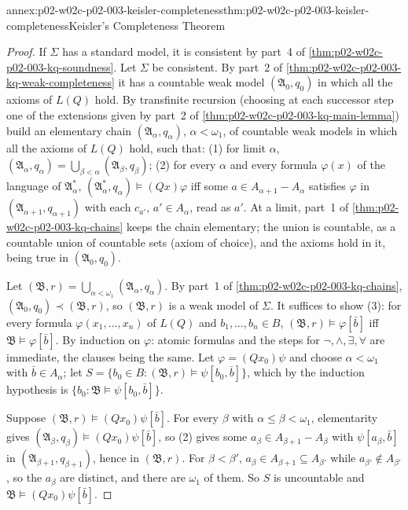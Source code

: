 \begin{annexitem}{annex:p02-w02c-p02-003-keisler-completeness}{thm:p02-w02c-p02-003-keisler-completeness}{Keisler's Completeness Theorem}
\begin{proof}
If \(\Sigma\) has a standard model, it is consistent by part~4 of
\cref{thm:p02-w02c-p02-003-kq-soundness}.  Let \(\Sigma\) be consistent.
By part~2 of \cref{thm:p02-w02c-p02-003-kq-weak-completeness} it has a
countable weak model \((\mathfrak A_0,q_0)\) in which all the axioms of
\(L(Q)\) hold.  By transfinite recursion (choosing at each successor step
one of the extensions given by part~2 of
\cref{thm:p02-w02c-p02-003-kq-main-lemma}) build an elementary chain
\((\mathfrak A_\alpha,q_\alpha)\), \(\alpha<\omega_1\), of countable weak
models in which all the axioms of \(L(Q)\) hold, such that: (1) for limit
\(\alpha\), \((\mathfrak A_\alpha,q_\alpha)=\bigcup_{\beta<\alpha}
(\mathfrak A_\beta,q_\beta)\); (2) for every \(\alpha\) and every formula
\(\varphi(x)\) of the language of \(\mathfrak A_\alpha^{*}\),
\((\mathfrak A_\alpha^{*},q_\alpha)\models(Qx)\varphi\) iff some \(a\in
A_{\alpha+1}-A_\alpha\) satisfies \(\varphi\) in
\((\mathfrak A_{\alpha+1},q_{\alpha+1})\) with each \(c_{a'}\),
\(a'\in A_\alpha\), read as \(a'\).  At a limit, part~1 of
\cref{thm:p02-w02c-p02-003-kq-chains} keeps the chain elementary; the union
is countable, as a countable union of countable sets (axiom of choice), and
the axioms hold in it, being true in \((\mathfrak A_0,q_0)\).

Let \((\mathfrak B,r)=\bigcup_{\alpha<\omega_1}(\mathfrak A_\alpha,q_\alpha)\).
By part~1 of \cref{thm:p02-w02c-p02-003-kq-chains},
\((\mathfrak A_0,q_0)\prec(\mathfrak B,r)\), so \((\mathfrak B,r)\) is a
weak model of \(\Sigma\).  It suffices to show (3): for every formula
\(\varphi(x_1,\ldots,x_n)\) of \(L(Q)\) and \(b_1,\ldots,b_n\in B\),
\((\mathfrak B,r)\models\varphi[\bar b]\) iff \(\mathfrak B\models\varphi[\bar
b]\).  By induction on \(\varphi\): atomic formulas and the steps for
\(\neg,\land,\exists,\forall\) are immediate, the clauses being the same.
Let \(\varphi=(Qx_0)\psi\) and choose \(\alpha<\omega_1\) with \(\bar b\in
A_\alpha\); let
\(S=\{b_0\in B:(\mathfrak B,r)\models\psi[b_0,\bar b]\}\), which by the
induction hypothesis is \(\{b_0:\mathfrak B\models\psi[b_0,\bar b]\}\).

Suppose \((\mathfrak B,r)\models(Qx_0)\psi[\bar b]\).  For every
\(\beta\) with \(\alpha\le\beta<\omega_1\), elementarity gives
\((\mathfrak A_\beta,q_\beta)\models(Qx_0)\psi[\bar b]\), so (2) gives some
\(a_\beta\in A_{\beta+1}-A_\beta\) with \(\psi[a_\beta,\bar b]\) in
\((\mathfrak A_{\beta+1},q_{\beta+1})\), hence in \((\mathfrak B,r)\).  For
\(\beta<\beta'\), \(a_\beta\in A_{\beta+1}\subseteq A_{\beta'}\) while
\(a_{\beta'}\notin A_{\beta'}\), so the \(a_\beta\) are distinct, and there
are \(\omega_1\) of them.  So \(S\) is uncountable and
\(\mathfrak B\models(Qx_0)\psi[\bar b]\).


\end{proof}
\end{annexitem}
